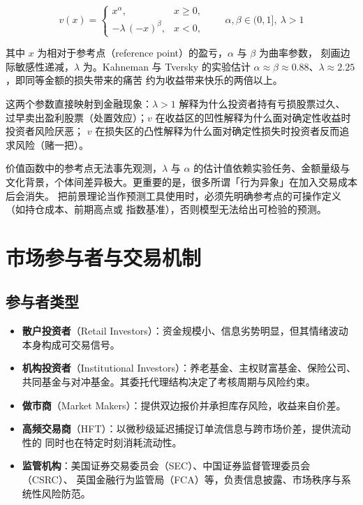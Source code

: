\begin{equation}\label{eq:01-prospect}
  v(x) =
  \begin{cases}
    x^{\alpha}, & x \ge 0, \\
    -\lambda\,(-x)^{\beta}, & x < 0,
  \end{cases}
  \qquad \alpha, \beta \in (0,1],\ \lambda > 1
\end{equation}

其中 $x$ 为相对于参考点（reference point）的盈亏，$\alpha$ 与 $\beta$ 为曲率参数，
刻画边际敏感性递减，$\lambda$ 为。Kahneman 与 Tversky 的实验估计
$\alpha \approx \beta \approx 0.88$、$\lambda \approx 2.25$，即同等金额的损失带来的痛苦
约为收益带来快乐的两倍以上。

这两个参数直接映射到金融现象：$\lambda > 1$ 解释为什么投资者持有亏损股票过久、
过早卖出盈利股票（处置效应）；$v$ 在收益区的凹性解释为什么面对确定性收益时投资者风险厌恶；
$v$ 在损失区的凸性解释为什么面对确定性损失时投资者反而追求风险（赌一把）。

\begin{warningbox}[前景理论不是交易策略]
价值函数中的参考点无法事先观测，$\lambda$ 与 $\alpha$ 的估计值依赖实验任务、金额量级与
文化背景，个体间差异极大。更重要的是，很多所谓「行为异象」在加入交易成本后会消失。
把前景理论当作预测工具使用时，必须先明确参考点的可操作定义（如持仓成本、前期高点或
指数基准），否则模型无法给出可检验的预测。
\end{warningbox}

\section{市场参与者与交易机制}

\subsection{参与者类型}

\begin{itemize}[leftmargin=*]
  \item \textbf{散户投资者}（Retail Investors）：资金规模小、信息劣势明显，但其情绪波动
        本身构成可交易信号。
  \item \textbf{机构投资者}（Institutional Investors）：养老基金、主权财富基金、保险公司、
        共同基金与对冲基金。其委托代理结构决定了考核周期与风险约束。
  \item \textbf{做市商}（Market Makers）：提供双边报价并承担库存风险，收益来自价差。
  \item \textbf{高频交易商}（HFT）：以微秒级延迟捕捉订单流信息与跨市场价差，提供流动性的
        同时也在特定时刻消耗流动性。
  \item \textbf{监管机构}：美国证券交易委员会（SEC）、中国证券监督管理委员会（CSRC）、
        英国金融行为监管局（FCA）等，负责信息披露、市场秩序与系统性风险防范。
\end{itemize}

